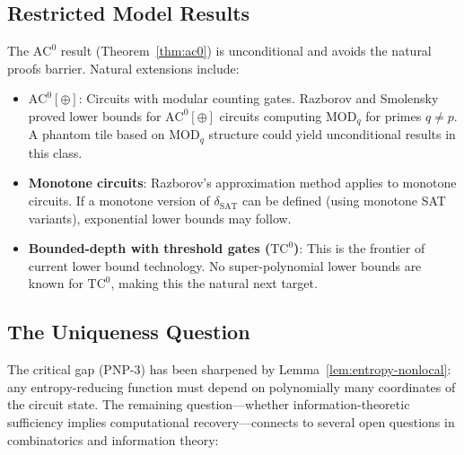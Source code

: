 \documentclass[11pt]{article}
\theoremstyle{definition}
\theoremstyle{remark}
\newcommand{\ACz}{\mathrm{AC}^0}
\newcommand{\TCz}{\mathrm{TC}^0}
\newcommand{\dSAT}{\delta_{\mathrm{SAT}}}
\begin{document}
\subsection{Restricted Model Results}

The $\ACz$ result (Theorem~\ref{thm:ac0}) is unconditional and avoids
the natural proofs barrier.  Natural extensions include:

\begin{itemize}
  \item \textbf{$\ACz[\oplus]$}: Circuits with modular counting gates.
    Razborov \cite{Raz87} and Smolensky \cite{Smol87} proved lower bounds
    for $\ACz[\oplus]$ circuits computing $\mathrm{MOD}_q$ for primes
    $q \neq p$.  A phantom tile based on $\mathrm{MOD}_q$ structure could
    yield unconditional results in this class.

  \item \textbf{Monotone circuits}: Razborov's approximation method
    \cite{Raz} applies to monotone circuits.  If a monotone version of
    $\dSAT$ can be defined (using monotone SAT variants), exponential
    lower bounds may follow.

  \item \textbf{Bounded-depth with threshold gates ($\TCz$)}: This is the
    frontier of current lower bound technology.  No super-polynomial lower
    bounds are known for $\TCz$, making this the natural next target.
\end{itemize}

\subsection{The Uniqueness Question}

The critical gap (PNP-3) has been sharpened by
Lemma~\ref{lem:entropy-nonlocal}: any entropy-reducing function must depend
on polynomially many coordinates of the circuit state.  The remaining
question---whether information-theoretic sufficiency implies computational
recovery---connects to several open questions in combinatorics and
information theory:
\end{document}
